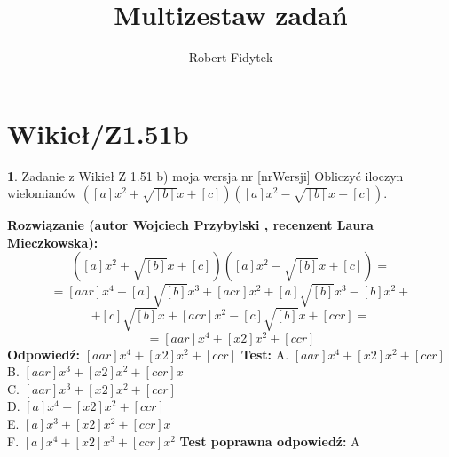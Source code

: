 \documentclass[12pt, a4paper]{article}
\title{Multizestaw zadań}
\author{Robert Fidytek}
\date{}
\theoremstyle{definition} %
\newtheorem{zad}{}
\newcommand{\kategoria}[1]{\section{#1}} %
\newcommand{\zadStart}[1]{\begin{zad}#1\newline} %
\newcommand{\zadStop}{\end{zad}}   %
\newcommand{\rozwStart}[2]{\noindent \textbf{Rozwiązanie (autor #1 , recenzent #2): }\newline} %
\newcommand{\rozwStop}{\newline}                                            %
\newcommand{\odpStart}{\noindent \textbf{Odpowiedź:}\newline}    %
\newcommand{\odpStop}{\newline}                                             %
\newcommand{\testStart}{\noindent \textbf{Test:}\newline} %
\newcommand{\testStop}{\newline} %
\newcommand{\kluczStart}{\noindent \textbf{Test poprawna odpowiedź:}\newline} %
\newcommand{\kluczStop}{\newline} %
\begin{document}
\maketitle


\kategoria{Wikieł/Z1.51b}
\zadStart{Zadanie z Wikieł Z 1.51 b) moja wersja nr [nrWersji]}
Obliczyć iloczyn wielomianów $([a]x^{2}+\sqrt{[b]}x+[c])([a]x^{2}-\sqrt{[b]}x+[c])$.
\zadStop
\rozwStart{Wojciech Przybylski}{Laura Mieczkowska}
$$([a]x^{2}+\sqrt{[b]}x+[c])([a]x^{2}-\sqrt{[b]}x+[c])=$$
$$=[aar]x^{4}-[a]\sqrt{[b]}x^{3}+[acr]x^{2}+[a]\sqrt{[b]}x^{3}-[b]x^{2}+$$
$$+[c]\sqrt{[b]}x+[acr]x^{2}-[c]\sqrt{[b]}x+[ccr]=$$
$$=[aar]x^{4}+[x2]x^{2}+[ccr]$$
\rozwStop
\odpStart
$[aar]x^{4}+[x2]x^{2}+[ccr]$
\odpStop
\testStart
A. $[aar]x^{4}+[x2]x^{2}+[ccr]$\\
B. $[aar]x^{3}+[x2]x^{2}+[ccr]x$\\
C. $[aar]x^{3}+[x2]x^{2}+[ccr]$\\
D. $[a]x^{4}+[x2]x^{2}+[ccr]$\\
E. $[a]x^{3}+[x2]x^{2}+[ccr]x$\\
F. $[a]x^{4}+[x2]x^{3}+[ccr]x^{2}$
\testStop
\kluczStart
A
\kluczStop
\end{document}
